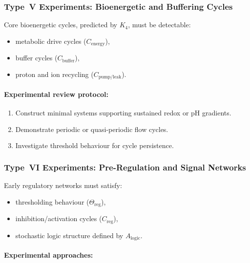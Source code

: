 \subsubsection{Type~V Experiments: Bioenergetic and Buffering Cycles}

Core bioenergetic cycles, predicted by $K_4$, must be detectable:

\begin{itemize}
    \item metabolic drive cycles ($C_{\mathrm{energy}}$),
    \item buffer cycles ($C_{\mathrm{buffer}}$),
    \item proton and ion recycling ($C_{\mathrm{pump/leak}}$).
\end{itemize}

\paragraph{Experimental review protocol:}

\begin{enumerate}
    \item Construct minimal systems supporting sustained redox or pH gradients.
    \item Demonstrate periodic or quasi-periodic flow cycles.
    \item Investigate threshold behaviour for cycle persistence.
\end{enumerate}



\subsubsection{Type~VI Experiments: Pre-Regulation and Signal Networks}

Early regulatory networks must satisfy:

\begin{itemize}
    \item thresholding behaviour ($\Theta_{\mathrm{reg}}$),
    \item inhibition/activation cycles ($C_{\mathrm{reg}}$),
    \item stochastic logic structure defined by $A_{\mathrm{logic}}$.
\end{itemize}

\paragraph{Experimental approaches:}

